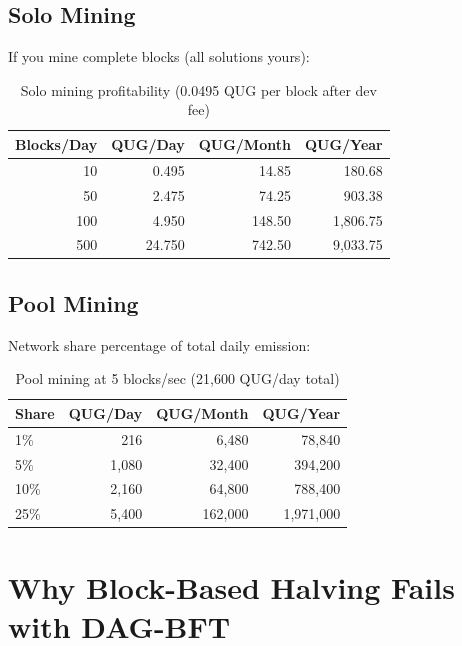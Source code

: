 \documentclass[11pt,a4paper]{article}
\begin{document}
\subsection{Solo Mining}

If you mine complete blocks (all solutions yours):

\begin{table}[h]
\centering
\begin{tabular}{rrrr}
\toprule
\textbf{Blocks/Day} & \textbf{QUG/Day} & \textbf{QUG/Month} & \textbf{QUG/Year} \\
\midrule
10 & 0.495 & 14.85 & 180.68 \\
50 & 2.475 & 74.25 & 903.38 \\
100 & 4.950 & 148.50 & 1,806.75 \\
500 & 24.750 & 742.50 & 9,033.75 \\
\bottomrule
\end{tabular}
\caption{Solo mining profitability (0.0495 QUG per block after dev fee)}
\end{table}

\subsection{Pool Mining}

Network share percentage of total daily emission:

\begin{table}[h]
\centering
\begin{tabular}{lrrr}
\toprule
\textbf{Share} & \textbf{QUG/Day} & \textbf{QUG/Month} & \textbf{QUG/Year} \\
\midrule
1\% & 216 & 6,480 & 78,840 \\
5\% & 1,080 & 32,400 & 394,200 \\
10\% & 2,160 & 64,800 & 788,400 \\
25\% & 5,400 & 162,000 & 1,971,000 \\
\bottomrule
\end{tabular}
\caption{Pool mining at 5 blocks/sec (21,600 QUG/day total)}
\end{table}

\section{Why Block-Based Halving Fails with DAG-BFT}
\end{document}
